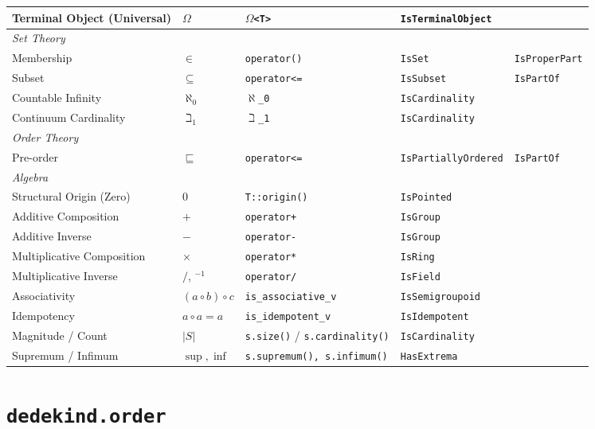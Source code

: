 \documentclass[11pt, a4paper]{report}
\begin{document}
\begin{table}
\begin{small}
\begin{tabular}{@{}lllll@{}}
Terminal Object (Universal) & $\Omega$ & \texttt{$\Omega$<T>} & \texttt{IsTerminalObject} & \\ 
\midrule
\textit{Set Theory} & & & & \\
Membership & $\in$ & \texttt{operator()} & \texttt{IsSet} & \texttt{IsProperPart}\\
Subset & $\subseteq$ & \texttt{operator<=} & \texttt{IsSubset} & \texttt{IsPartOf}\\
Countable Infinity & $\aleph_0$ & $\aleph$\texttt{\_0} & \texttt{IsCardinality} & \\
Continuum Cardinality & $\beth_1$ & $\beth$\texttt{\_1} & \texttt{IsCardinality} & \\
\midrule
\textit{Order Theory} & & & & \\
Pre-order & $\sqsubseteq$ & \texttt{operator<=} & \texttt{IsPartiallyOrdered} & \texttt{IsPartOf}\\
\midrule
\textit{Algebra} & & & & \\
Structural Origin (Zero) & $0$ & \texttt{T::origin()} & \texttt{IsPointed} & \\
Additive Composition & $+$ & \texttt{operator+} & \texttt{IsGroup} & \\
Additive Inverse & $-$ & \texttt{operator-} & \texttt{IsGroup} & \\
Multiplicative Composition & $\times$ & \texttt{operator*} & \texttt{IsRing} & \\
Multiplicative Inverse & $/$, $^{-1}$ & \texttt{operator/} & \texttt{IsField} & \\
Associativity & $(a \circ b) \circ c$ & \texttt{is\_associative\_v} & \texttt{IsSemigroupoid} & \\
Idempotency & $a \circ a = a$ & \texttt{is\_idempotent\_v} & \texttt{IsIdempotent} & \\
Magnitude / Count & $|S|$ & \texttt{s.size()} / \texttt{s.cardinality()} & \texttt{IsCardinality} & \\
Supremum / Infimum & $\sup, \inf$ & \texttt{s.supremum(), s.infimum()} & \texttt{HasExtrema} & \\
\bottomrule
\end{tabular}
\end{small}
\end{table}

\chapter{\texttt{dedekind.order}}
\label{chap:order}
\end{document}
